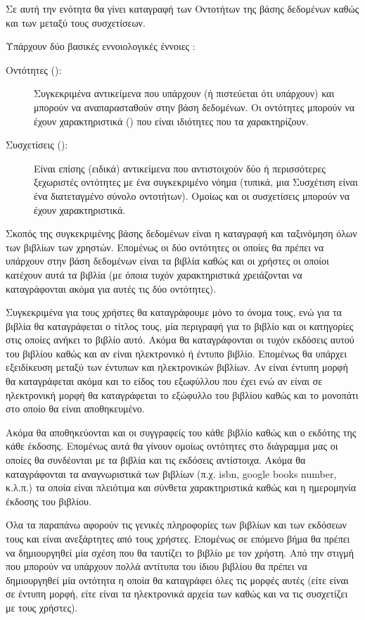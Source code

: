 \documentclass{assignment}
\begin{document}
Σε αυτή την ενότητα θα γίνει καταγραφή των Οντοτήτων της βάσης δεδομένων καθώς και των μεταξύ τους συσχετίσεων.

Υπάρχουν δύο βασικές εννοιολογικές έννοιες \cite{class_notes}:
\begin{description}
  \item[Οντότητες ():] Συγκεκριμένα αντικείμενα που υπάρχουν (ή πιστεύεται ότι υπάρχουν) και μπορούν να αναπαρασταθούν στην βάση δεδομένων. Οι οντότητες μπορούν να έχουν χαρακτηριστικά () που είναι ιδιότητες που τα χαρακτηρίζουν.
  \item[Συσχετίσεις ():] Είναι επίσης (ειδικά) αντικείμενα που αντιστοιχούν δύο ή περισσότερες ξεχωριστές οντότητες με ένα συγκεκριμένο νόημα (τυπικά, μια Συσχέτιση είναι ένα διατεταγμένο σύνολο οντοτήτων). Ομοίως και οι συσχετίσεις μπορούν να έχουν χαρακτηριστικά.
\end{description}

Σκοπός της συγκεκριμένης βάσης δεδομένων είναι η καταγραφή και ταξινόμηση όλων των βιβλίων των χρηστών. Επομένως οι δύο οντότητες οι οποίες θα πρέπει να υπάρχουν στην βάση δεδομένων είναι τα βιβλία καθώς και οι χρήστες οι οποίοι κατέχουν αυτά τα βιβλία (με όποια τυχόν χαρακτηριστικά χρειάζονται να καταγράφονται ακόμα για αυτές τις δύο οντότητες).

Συγκεκριμένα για τους χρήστες θα καταγράφουμε μόνο το όνομα τους, ενώ για τα βιβλία θα καταγράφεται ο τίτλος τους, μία περιγραφή για το βιβλίο και οι κατηγορίες στις οποίες ανήκει το βιβλίο αυτό. Ακόμα θα καταγράφονται οι τυχόν εκδόσεις αυτού του βιβλίου καθώς και αν είναι ηλεκτρονικό ή έντυπο βιβλίο. Επομένως θα υπάρχει εξειδίκευση μεταξύ των έντυπων και ηλεκτρονικών βιβλίων. Αν είναι έντυπη μορφή θα καταγράφεται ακόμα και το είδος του εξωφύλλου που έχει ενώ αν είναι σε ηλεκτρονική μορφή θα καταγράφεται το εξώφυλλο του βιβλίου καθώς και το μονοπάτι στο οποίο θα είναι αποθηκευμένο.

Ακόμα θα αποθηκεύονται και οι συγγραφείς του κάθε βιβλίο καθώς και ο εκδότης της κάθε έκδοσης. Επομένως αυτά θα γίνουν ομοίως οντότητες στο διάγραμμα μας οι οποίες θα συνδέονται με τα βιβλία και τις εκδόσεις αντίστοιχα. Ακόμα θα καταγράφονται τα αναγνωριστικά των βιβλίων (π.χ. isbn, google books number, κ.λ.π.) τα οποία είναι πλειότιμα και σύνθετα χαρακτηριστικά καθώς και η ημερομηνία έκδοσης του βιβλίου.

Όλα τα παραπάνω αφορούν τις γενικές πληροφορίες των βιβλίων και των εκδόσεων τους και είναι ανεξάρτητες από τους χρήστες. Επομένως σε επόμενο βήμα θα πρέπει να δημιουργηθεί μία σχέση που θα ταυτίζει το βιβλίο με τον χρήστη. Από την στιγμή που μπορούν να υπάρχουν πολλά αντίτυπα του ίδιου βιβλίου θα πρέπει να δημιουργηθεί μία οντότητα η οποία θα καταγράφει όλες τις μορφές αυτές (είτε είναι σε έντυπη μορφή, είτε είναι τα ηλεκτρονικά αρχεία των  καθώς και να τις συσχετίζει με τους χρήστες).
\end{document}
